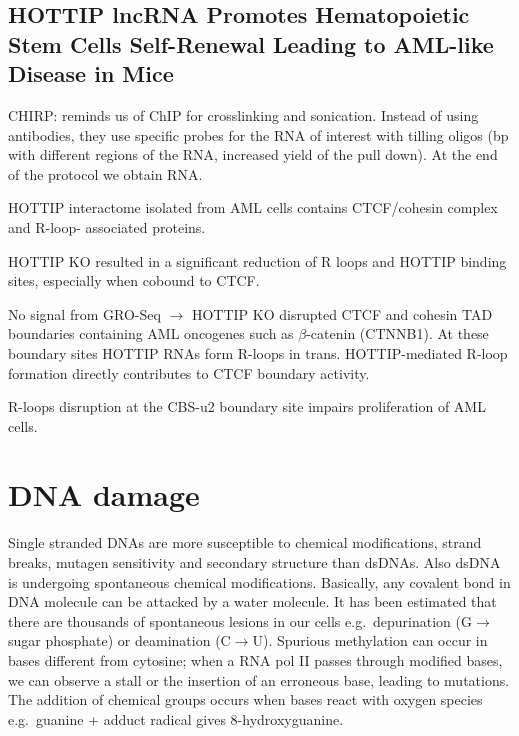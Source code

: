 \hypertarget{hottip-lncrna-promotes-hematopoietic-stem-cells-self-renewal-leading-to-aml-like-disease-in-mice}{%
\subsection{HOTTIP lncRNA Promotes Hematopoietic Stem Cells Self-Renewal Leading to AML-like Disease in Mice}\label{hottip-lncrna-promotes-hematopoietic-stem-cells-self-renewal-leading-to-aml-like-disease-in-mice}}

CHIRP: reminds us of ChIP for crosslinking and sonication. Instead of using antibodies, they use specific probes for the RNA of interest with tilling oligos (bp with different regions of the RNA, increased yield of the pull down). At the end of the protocol we obtain RNA.

HOTTIP interactome isolated from AML cells contains CTCF/cohesin complex and R-loop- associated proteins.

HOTTIP KO resulted in a significant reduction of R loops and HOTTIP binding sites, especially when cobound to CTCF.

No signal from GRO-Seq $\rightarrow$ HOTTIP KO disrupted CTCF and cohesin TAD boundaries containing AML oncogenes such as $\beta$-catenin (CTNNB1). At these boundary sites HOTTIP RNAs form R-loops in trans. HOTTIP-mediated R-loop formation directly contributes to CTCF boundary activity.

R-loops disruption at the CBS-u2 boundary site impairs proliferation of AML cells.

\hypertarget{dna-damage}{%
\section{DNA damage}\label{dna-damage}}

Single stranded DNAs are more susceptible to chemical modifications, strand breaks, mutagen sensitivity and secondary structure than dsDNAs. Also dsDNA is undergoing spontaneous chemical modifications. Basically, any covalent bond in DNA molecule can be attacked by a water molecule. It has been estimated that there are thousands of spontaneous lesions in our cells e.g.~depurination (G$\rightarrow$sugar phosphate) or deamination (C$\rightarrow$U). Spurious methylation can occur in bases different from cytosine; when a RNA pol II passes through modified bases, we can observe a stall or the insertion of an erroneous base, leading to mutations. The addition of chemical groups occurs when bases react with oxygen species e.g.~guanine + adduct radical gives 8-hydroxyguanine.


